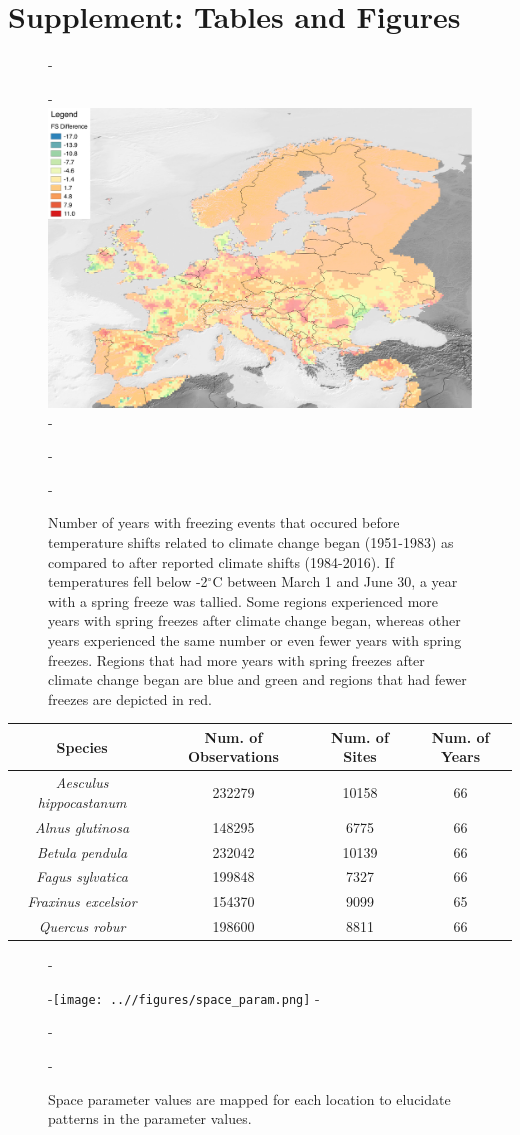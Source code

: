 \documentclass{article}\usepackage[]{graphicx}\usepackage[]{color}
\begin{document}
\section*{Supplement: Tables and Figures}
{\begin{figure} [H]
  -\begin{center}
  -\includegraphics[width=12cm]{..//figures/FS_Diff.pdf}
  -\caption{Number of years with freezing events that occured before temperature shifts related to climate change began (1951-1983) as compared to after reported climate shifts (1984-2016). If temperatures fell below -2$^{\circ}$C between March 1 and June 30, a year with a spring freeze was tallied. Some regions experienced more years with spring freezes after climate change began, whereas other years experienced the same number or even fewer years with spring freezes. Regions that had more years with spring freezes after climate change began are blue and green and regions that had fewer freezes are depicted in red.}\label{fig:region}
  -\end{center}
  -\end{figure}}
  
\begin{center}
 \label{tab:spp} 
\begin{tabular}{c c c c}
\hline
\textbf{Species} & \textbf{Num. of Observations} & \textbf{Num. of Sites} & \textbf{Num. of Years} \\
\hline
\textit{Aesculus hippocastanum} & 232279 & 10158 & 66  \\
\hline
\textit{Alnus glutinosa} & 148295 & 6775 & 66 \\
\hline
\textit{Betula pendula} & 232042 & 10139 & 66 \\
\hline
\textit{Fagus sylvatica} & 199848 & 7327 & 66 \\
\hline
\textit{Fraxinus excelsior} & 154370 & 9099 & 65 \\
\hline
\textit{Quercus robur} & 198600  & 8811 & 66 \\
\end{tabular}
\end{center}
  
{\begin{figure} [H]
  -\begin{center}
  -\texttt{[image: ..//figures/space\_param.png]}
  -\caption{Space parameter values are mapped for each location to elucidate patterns in the parameter values.}\label{fig:space}
  -\end{center}
  -\end{figure}}
\end{document}
